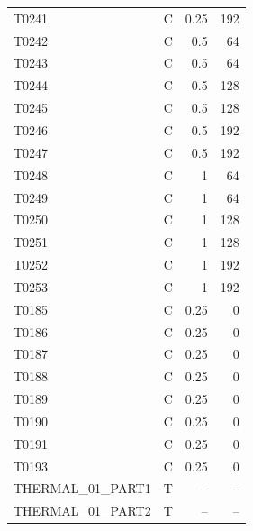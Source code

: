 \documentclass[10pt,letterpaper]{article}
\begin{document}
\begin{minipage}[t]{0.48\textwidth}
\begin{tabular}{lcrr}
T0241 & C & 0.25 & 192\\
T0242 & C & 0.5 & 64\\
T0243 & C & 0.5 & 64\\
T0244 & C & 0.5 & 128\\
T0245 & C & 0.5 & 128\\
T0246 & C & 0.5 & 192\\
T0247 & C & 0.5 & 192\\
T0248 & C & 1 & 64\\
T0249 & C & 1 & 64\\
T0250 & C & 1 & 128\\
T0251 & C & 1 & 128\\
T0252 & C & 1 & 192\\
T0253 & C & 1 & 192\\
T0185 & C & 0.25 & 0\\
T0186 & C & 0.25 & 0\\
T0187 & C & 0.25 & 0\\
T0188 & C & 0.25 & 0\\
T0189 & C & 0.25 & 0\\
T0190 & C & 0.25 & 0\\
T0191 & C & 0.25 & 0\\
T0193 & C & 0.25 & 0\\
THERMAL\_01\_PART1 & T & -- & --\\
THERMAL\_01\_PART2 & T & -- & --\\
\bottomrule\end{tabular}\end{minipage}
\par\normalsize
\end{document}
